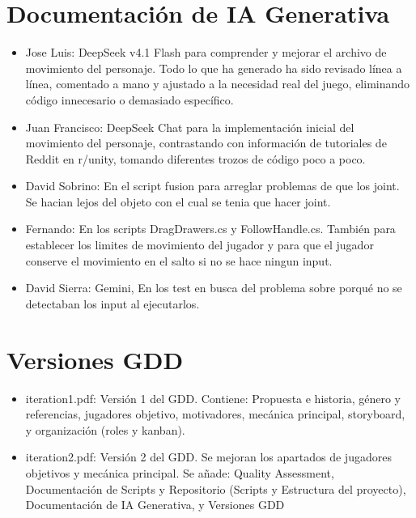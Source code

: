 \documentclass[12pt,twoside,letterpaper]{article}
\begin{document}
\section{Documentación de IA Generativa}
\begin{itemize}
    \item Jose Luis: DeepSeek v4.1 Flash para comprender y mejorar el archivo de movimiento del personaje. Todo lo que ha generado ha sido revisado línea a línea, comentado a mano y ajustado a la necesidad real del juego, eliminando código innecesario o demasiado específico.
    \item Juan Francisco: DeepSeek Chat para la implementación inicial del movimiento del personaje, contrastando con información de tutoriales de Reddit en r/unity, tomando diferentes trozos de código poco a poco.
     \item David Sobrino: En el script fusion para arreglar problemas de que los joint. Se hacian lejos del objeto con el cual se tenia que hacer joint.
     \item Fernando: En los scripts DragDrawers.cs y FollowHandle.cs. También para establecer los limites de movimiento del jugador y para que el jugador conserve el movimiento en el salto si no se hace ningun input.
     \item David Sierra: Gemini, En los test en busca del problema sobre porqué no se detectaban los input al ejecutarlos.

\end{itemize}

\section{Versiones GDD}
\begin{itemize}
    \item iteration1.pdf: Versión 1 del GDD. Contiene: Propuesta e historia, género y referencias, jugadores objetivo, motivadores, mecánica principal, storyboard, y organización (roles y kanban). 
    \item iteration2.pdf: Versión 2 del GDD. Se mejoran los apartados de jugadores objetivos y mecánica principal. Se añade: Quality Assessment, Documentación de Scripts y Repositorio (Scripts y Estructura del proyecto), Documentación de IA Generativa, y Versiones GDD
     

\end{itemize}
\end{document}
